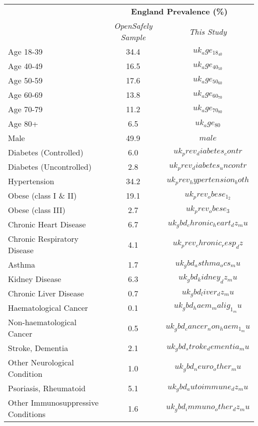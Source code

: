 \begin{tabular}{p{6cm}cc}
& \multicolumn{2}{c}{\textbf{England Prevalence (\%)  }} \\[0.5ex] &
  \emph{OpenSafely Sample} & \emph{This Study} \\[2ex]
Age 18-39 & 34.4 & $$uk_age_18_40$$ \\[0.25ex]
Age 40-49 & 16.5 & $$uk_age_40_50$$ \\[0.25ex]
Age 50-59 & 17.6 & $$uk_age_50_60$$\\[0.25ex]
Age 60-69 & 13.8 & $$uk_age_60_70$$\\[0.25ex]
Age 70-79 & 11.2 & $$uk_age_70_80$$\\[0.25ex]
Age 80+ & 6.5 & $$uk_age_80$$ \\[0.25ex]
Male & 49.9 & $$male$$ \\[0.25ex]
Diabetes (Controlled) & 6.0 & $$uk_prev_diabetes_contr$$ \\[0.25ex]
Diabetes (Uncontrolled) & 2.8 & $$uk_prev_diabetes_uncontr$$ \\[0.25ex]
Hypertension & 34.2 & $$uk_prev_hypertension_both$$ \\[0.25ex]
Obese (class I \& II) & 19.1 & $$uk_prev_obese_1_2$$ \\[0.25ex]
Obese (class III) & 2.7 & $$uk_prev_obese_3$$ \\[0.25ex]
Chronic Heart Disease & 6.7 & $$uk_gbd_chronic_heart_dz_mu$$ \\[0.25ex]
Chronic Respiratory Disease & 4.1 & $$uk_prev_chronic_resp_dz$$
\\[0.25ex]
Asthma & 1.7 & $$uk_gbd_asthma_ocs_mu$$ \\[0.25ex]
Kidney Disease & 6.3 & $$uk_gbd_kidney_dz_mu$$ \\[0.25ex]
Chronic Liver Disease & 0.7 & $$uk_gbd_liver_dz_mu$$ \\[0.25ex]
Haematological Cancer & 0.1 & $$uk_gbd_haem_malig_1_mu$$\\[0.25ex]
Non-haematological Cancer & 0.5 & $$uk_gbd_cancer_non_haem_1_mu$$ \\[0.25ex]
Stroke, Dementia & 2.1 & $$uk_gbd_stroke_dementia_mu$$ \\[0.25ex]
Other Neurological Condition & 1.0 & $$uk_gbd_neuro_other_mu$$ \\[0.25ex]
Psoriasis, Rheumatoid & 5.1 & $$uk_gbd_autoimmune_dz_mu$$ \\[0.25ex]
Other Immunosuppressive Conditions & 1.6 & $$uk_gbd_immuno_other_dz_mu$$ \\[0.25ex]
\end{tabular}
